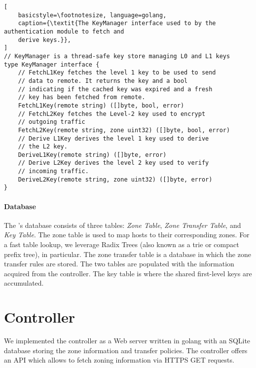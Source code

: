 \begin{lstlisting}[
	basicstyle=\footnotesize, language=golang,
	caption={\textit{The KeyManager interface used to by the authentication module to fetch and
	derive keys.}},
]
// KeyManager is a thread-safe key store managing L0 and L1 keys
type KeyManager interface {
	// FetchL1Key fetches the level 1 key to be used to send
	// data to remote. It returns the key and a bool
	// indicating if the cached key was expired and a fresh
	// key has been fetched from remote.
	FetchL1Key(remote string) ([]byte, bool, error)
	// FetchL2Key fetches the Level-2 key used to encrypt
	// outgoing traffic
	FetchL2Key(remote string, zone uint32) ([]byte, bool, error)
	// Derive L1Key derives the level 1 key used to derive
	// the L2 key.
	DeriveL1Key(remote string) ([]byte, error)
	// Derive L2Key derives the level 2 key used to verify
	// incoming traffic.
	DeriveL2Key(remote string, zone uint32) ([]byte, error)
}
\end{lstlisting}

\paragraph{Database}
The \tp's database consists of three tables: \textit{Zone Table}, \textit{Zone Transfer
	Table}, and \textit{Key Table}. The zone table is used to map hosts to their corresponding
zones. For a fast table lookup, we leverage Radix Trees (also known as a trie or compact prefix
tree),  in particular. The zone transfer table is a database
in which the zone transfer rules are stored. The two tables are populated with the information
acquired from the controller. The key table is where the shared first-level keys are
accumulated.

\section{Controller}
\label{sec:controller}

We implemented the controller as a Web server written in golang with an SQLite database storing the
zone information and transfer policies. The controller offers an API which allows
\tps to fetch zoning information via HTTPS GET requests.

